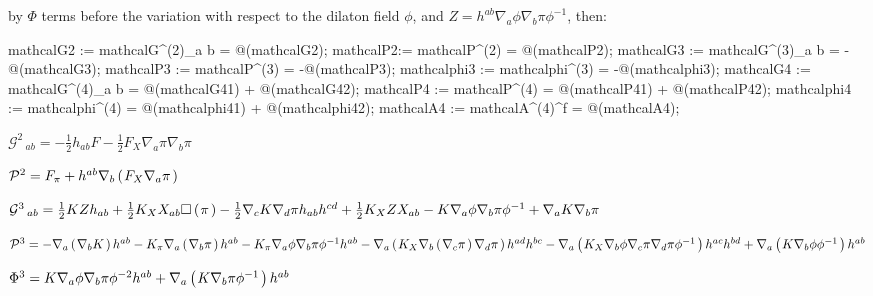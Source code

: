 \documentclass[10pt]{article}
\newcommand\brwrap[3]{%
  \setbox0=\hbox{$#2$}
  \left#1\vbox to \the\ht0{\hbox to 0pt{}}\right.\kern-.2em
  \begingroup #2\endgroup\kern-.15em
  \left.\vbox to \the\ht0{\hbox to 0pt{}}\right#3
}
\begin{document}
by $\Phi$ terms before the variation with respect to the dilaton field $\phi$, and $Z = h^{a b}\nabla_{a}{\phi}\nabla_{b}{\pi} \phi^{-1}$, then:
\begin{python}
mathcalG2 := mathcalG^{(2)}_{a b} = @(mathcalG2);
mathcalP2:= mathcalP^{(2)} = @(mathcalP2); 
mathcalG3 := mathcalG^{(3)}_{a b} = -@(mathcalG3);
mathcalP3 := mathcalP^{(3)} = -@(mathcalP3);
mathcalphi3 := mathcalphi^{(3)} = -@(mathcalphi3);
mathcalG4 := mathcalG^{(4)}_{a b} = @(mathcalG41) + @(mathcalG42);
mathcalP4 := mathcalP^{(4)} = @(mathcalP41) + @(mathcalP42);
mathcalphi4 := mathcalphi^{(4)} = @(mathcalphi41) + @(mathcalphi42);
mathcalA4 := mathcalA^{(4)}^{f} = @(mathcalA4);
\end{python}
\begin{adjustwidth}{1em}{0cm}${}\mathcal{G}^{2}\,_{a b} =  - \frac{1}{2}h_{a b} F - \frac{1}{2}F_{X} \nabla_{a}{\pi} \nabla_{b}{\pi}$\end{adjustwidth}
\begin{adjustwidth}{1em}{0cm}${}\mathcal{P}^{2} = F_{\pi}+h^{a b} \nabla_{b}\brwrap{(}{F_{X} \nabla_{a}{\pi}}{)}$\end{adjustwidth}
\begin{adjustwidth}{1em}{0cm}${}\mathcal{G}^{3}\,_{a b} = \frac{1}{2}K Z h_{a b}+\frac{1}{2}K_{X} X_{a b} \Box\brwrap{(}{\pi}{)} - \frac{1}{2}\nabla_{c}{K} \nabla_{d}{\pi} h_{a b} h^{c d}+\frac{1}{2}K_{X} Z X_{a b}-K \nabla_{a}{\phi} \nabla_{b}{\pi} {\phi}^{-1}+\nabla_{a}{K} \nabla_{b}{\pi}$\end{adjustwidth}
\begin{adjustwidth}{1em}{0cm}${}\mathcal{P}^{3} = -\nabla_{a}\brwrap{(}{\nabla_{b}{K}}{)} h^{a b}-K_{\pi} \nabla_{a}\brwrap{(}{\nabla_{b}{\pi}}{)} h^{a b}-K_{\pi} \nabla_{a}{\phi} \nabla_{b}{\pi} {\phi}^{-1} h^{a b}-\nabla_{a}\brwrap{(}{K_{X} \nabla_{b}\brwrap{(}{\nabla_{c}{\pi}}{)} \nabla_{d}{\pi}}{)} h^{a d} h^{b c}-\nabla_{a}\brwrap{(}{K_{X} \nabla_{b}{\phi} \nabla_{c}{\pi} \nabla_{d}{\pi} {\phi}^{-1}}{)} h^{a c} h^{b d}+\nabla_{a}\brwrap{(}{K \nabla_{b}{\phi} {\phi}^{-1}}{)} h^{a b}$\end{adjustwidth}
\begin{adjustwidth}{1em}{0cm}${}\Phi^{3} = K \nabla_{a}{\phi} \nabla_{b}{\pi} {\phi}^{-2} h^{a b}+\nabla_{a}\brwrap{(}{K \nabla_{b}{\pi} {\phi}^{-1}}{)} h^{a b}$\end{adjustwidth}
\end{document}
